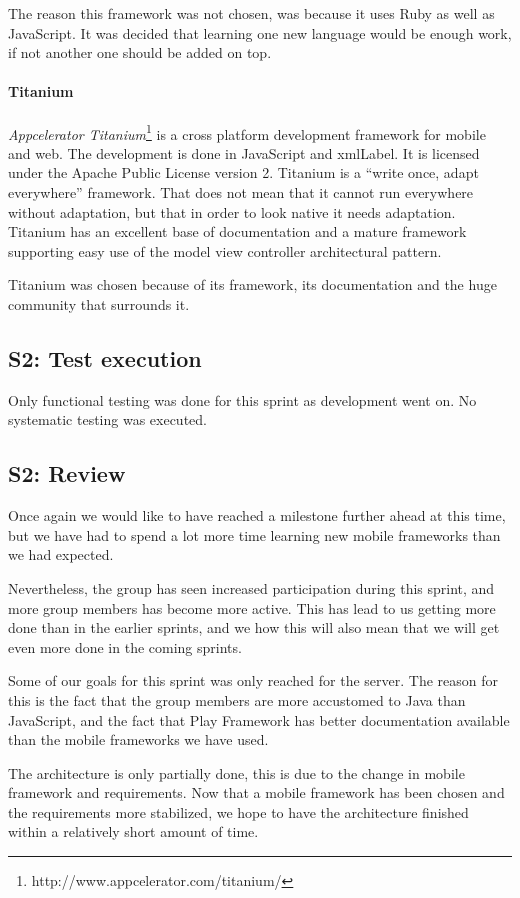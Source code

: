 \documentclass[11pt]{book}
\begin{document}
The reason this framework was not chosen, was because it uses Ruby as well as JavaScript. It was decided that learning one new language would be enough work, if not another one should be added on top.

\paragraph{Titanium}
\emph{Appcelerator Titanium}\footnote{http://www.appcelerator.com/titanium/} is a cross platform development framework for mobile and web. The development is done in JavaScript and \gls{xmlLabel}. It is licensed under the Apache Public License version 2. Titanium is a ``write once, adapt everywhere'' framework.\cite{titaniumCrossMobile} That does not mean that it cannot run everywhere without adaptation, but that in order to look native it needs adaptation. Titanium has an excellent base of documentation and a mature framework supporting easy use of the model view controller architectural pattern.

Titanium was chosen because of its framework, its documentation and the huge community that surrounds it.


\subsection{S2: Test execution}
Only functional testing was done for this sprint as development went on. No systematic testing was executed.

\subsection{S2: Review}
Once again we would like to have reached a milestone further ahead at this time, but we have had to spend a lot more time learning new mobile frameworks than we had expected. 

Nevertheless, the group has seen increased participation during this sprint, and more group members has become more active. This has lead to us getting more done than in the earlier sprints, and we how this will also mean that we will get even more done in the coming sprints.

Some of our goals for this sprint was only reached for the server. The reason for this is the fact that the group members are more accustomed to Java than JavaScript, and the fact that Play Framework has better documentation available than the mobile frameworks we have used.

The architecture is only partially done, this is due to the change in mobile framework and requirements. Now that a mobile framework has been chosen and the requirements more stabilized, we hope to have the architecture finished within a relatively short amount of time.
\end{document}
